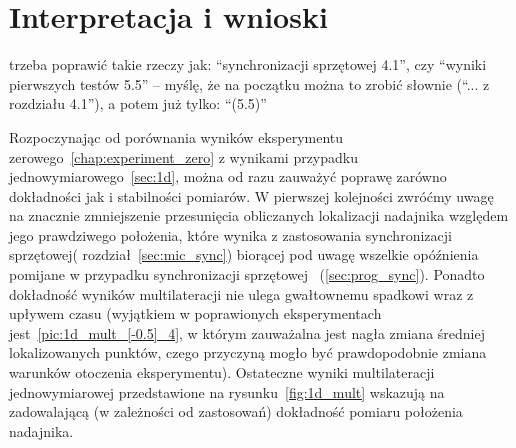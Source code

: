 \section{Interpretacja i wnioski}

\color{blue}
trzeba poprawić takie rzeczy jak: ``synchronizacji sprzętowej 4.1'', czy ``wyniki pierwszych testów 5.5'' -- myślę, że na początku można to zrobić słownie (``... z rozdziału 4.1''), a potem już tylko: ``(5.5)''
\color{black}

Rozpoczynając od porównania wyników eksperymentu zerowego~\ref{chap:experiment_zero} z wynikami przypadku jednowymiarowego~\ref{sec:1d}, można od razu zauważyć poprawę zarówno dokładności jak i stabilności pomiarów. W pierwszej kolejności zwróćmy uwagę na znacznie zmniejszenie przesunięcia obliczanych lokalizacji nadajnika względem jego prawdziwego położenia, które wynika z zastosowania synchronizacji sprzętowej( rozdział~\ref{sec:mic_sync}) biorącej pod uwagę wszelkie opóźnienia pomijane w przypadku synchronizacji sprzętowej ~(\ref{sec:prog_sync}). Ponadto dokładność wyników multilateracji nie ulega gwałtownemu spadkowi wraz z upływem czasu (wyjątkiem w poprawionych eksperymentach jest~\ref{pic:1d_mult_[-0.5]_4}, w którym zauważalna jest nagła zmiana średniej lokalizowanych punktów, czego przyczyną mogło być prawdopodobnie zmiana warunków otoczenia eksperymentu). Ostateczne wyniki multilateracji jednowymiarowej przedstawione na rysunku~\ref{fig:1d_mult} wskazują na zadowalającą (w zależności od zastosowań) dokładność pomiaru położenia nadajnika.

